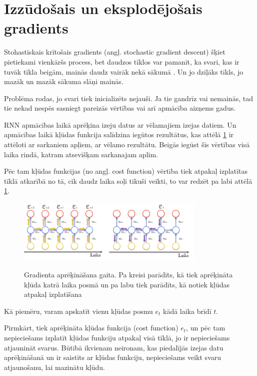 \documentclass[12pt,paper=A4]{report}
\begin{document}
\section{Izzūdošais un eksplodējošais gradients}

Stohastiskais krītošais gradients (angļ. stochastic gradient descent) šķiet pietiekami vienkāršs process, bet daudzos tīklos var pamanīt, ka svari, kas ir tuvāk tīkla beigām, mainās daudz vairāk nekā sākumā \cite{bengio1994learning}. Un jo dziļāks tīkls, jo mazāk un mazāk sākuma slāņi mainās. 

Problēma rodas, jo svari tiek inicializēts nejauši. Ja tie gandrīz vai nemainās, tad tie nekad nespēs sasniegt pareizās vērtības vai arī apmācība aizņems gadus.

RNN apmācības laikā aprēķina izeju datus ar vēlamajiem izejas datiem. Un apmācības laikā kļūdas funkcija salīdzina iegūtos rezultātus, kas attēlā \ref{VanishingGradient} ir attēloti ar sarkaniem apļiem, ar vēlamo rezultātu. Beigās iegūst šīs vērtības visā laika rindā, katram atsevišķam sarkanajam aplim. 

Pēc tam kļūdas funkcijas (no angļ. cost function) vērtība tiek atpakaļ izplatītas tīklā atkarībā no tā, cik daudz laika soļi tikuši veikti, to var redzēt pa labi attēlā \ref{VanishingGradient}.

\begin{figure}[H] \centering
\includegraphics[width=0.80\textwidth]{VanishingGradient} 
\caption{Gradienta aprēķināšana gaita. Pa kreisi parādīts, kā tiek aprēķināta kļūda katrā laika posmā un pa labu tiek parādīts, kā notiek kļūdas atpakaļ izplatīšana} \cite{https://www.superdatascience.com/recurrent-neural-networks-rnn-the-vanishing-gradient-problem/}
 \label{VanishingGradient} 
\end{figure}


Kā piemēru, varam apskatīt vienu kļūdas posmu $e_t$ kādā laika brīdī $t$.

Pirmkārt, tiek aprēķināta kļūdas funkcija (cost function) $e_t$, un pēc tam nepieciešams izplatīt kļūdas funkciju atpakaļ visā tīklā, jo ir nepieciešams atjaunināt svarus. Būtībā ikvienam neironam, kas piedalījās izejas datu aprēķināšanā un ir saistīts ar kļūdas funkciju, nepieciešams veikt svaru atjaunošanu, lai mazinātu kļūdu.
 
\end{document}
